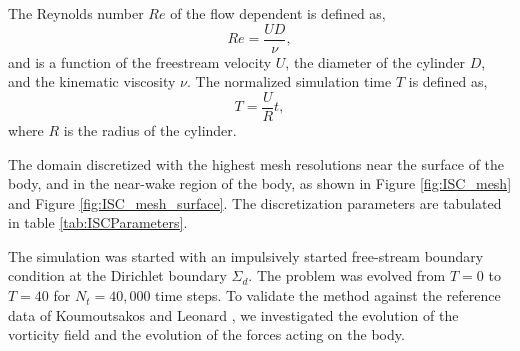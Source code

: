 The Reynolds number $Re$ of the flow dependent is defined as,
	\begin{equation}
	Re = \frac{UD}{\nu},
	\end{equation}
and is a function of the freestream velocity $U$, the diameter of the cylinder $D$, and the kinematic viscosity $\nu$. The normalized simulation time $T$ is defined as,
	\begin{equation}
	T = \frac{U}{R}t,
	\end{equation}	
where $R$ is the radius of the cylinder. 

The domain discretized with the highest mesh resolutions near the surface of the body, and in the near-wake region of the body, as shown in Figure \ref{fig:ISC_mesh} and Figure \ref{fig:ISC_mesh_surface}. The discretization parameters are tabulated in table \ref{tab:ISCParameters}.

The simulation was started with an impulsively started free-stream boundary condition at the Dirichlet boundary $\Sigma_{d}$. The problem was evolved from $T=0$ to $T=40$ for $N_{t}=40,000$ time steps. To validate the method against the reference data of Koumoutsakos and Leonard \cite{Koumoutsakos1995a}, we investigated the evolution of the vorticity field and the evolution of the forces acting on the body.


